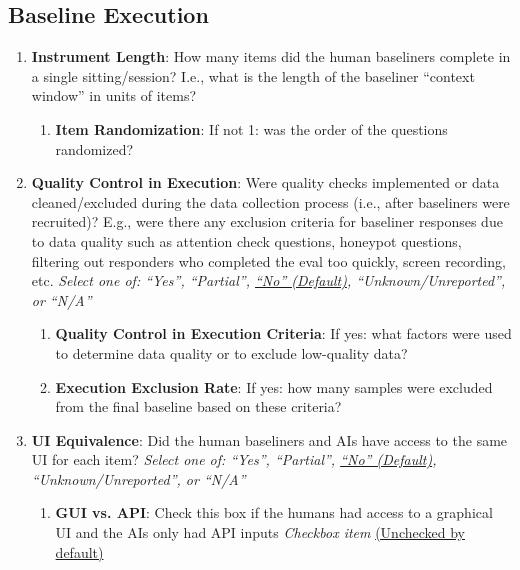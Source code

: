 \documentclass{article}
\begin{document}
\subsection{Baseline Execution}

\renewcommand{\labelenumi}{3.\arabic{enumi}}
\renewcommand{\labelenumii}{3.\arabic{enumi}.\arabic{enumii}}
\renewcommand{\labelenumiii}{3.\arabic{enumi}.\arabic{enumii}.\arabic{enumiii}}

\begin{enumerate}[leftmargin=30pt, topsep=0pt, itemsep=0pt]
    \item \textbf{Instrument Length}: How many items did the human baseliners complete in a single sitting/session? I.e., what is the length of the baseliner ``context window'' in units of items?
    \begin{enumerate}
        \item \textbf{Item Randomization}: If not 1: was the order of the questions randomized?
    \end{enumerate}
    
    \item \textbf{Quality Control in Execution}: Were quality checks implemented or data cleaned/excluded during the data collection process (i.e., after baseliners were recruited)? E.g., were there any exclusion criteria for baseliner responses due to data quality such as attention check questions, honeypot questions, filtering out responders who completed the eval too quickly, screen recording, etc.
    \newline \textit{Select one of: ``Yes'', ``Partial'', \ul{``No'' (Default)}, ``Unknown/Unreported'', or ``N/A''}
    \begin{enumerate}
        \item \textbf{Quality Control in Execution Criteria}: If yes: what factors were used to determine data quality or to exclude low-quality data?
        
        \item \textbf{Execution Exclusion Rate}: If yes: how many samples were excluded from the final baseline based on these criteria?
    \end{enumerate}
    
    \item \textbf{UI Equivalence}: Did the human baseliners and AIs have access to the same UI for each item?
    \newline \textit{Select one of: ``Yes'', ``Partial'', \ul{``No'' (Default)}, ``Unknown/Unreported'', or ``N/A''}
    \begin{enumerate}
        \item \textbf{GUI vs. API}: Check this box if the humans had access to a graphical UI and the AIs only had API inputs
        \newline \textit{Checkbox item} \ul{(Unchecked by default)}
        

\end{enumerate}
\end{enumerate}
\end{document}
